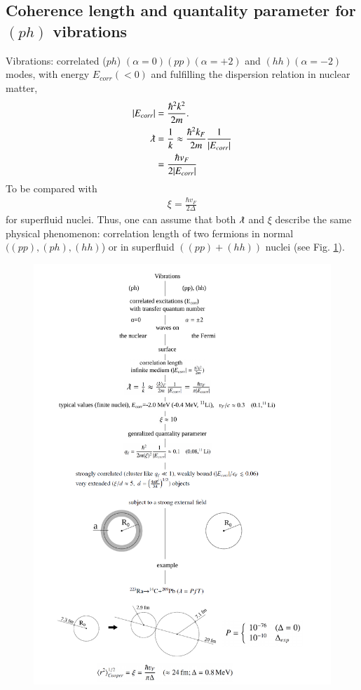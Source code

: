 \begin{subappendices}
 \subsection{Coherence length and quantality parameter for $(ph)$ vibrations}
 Vibrations: correlated ($ph$) $(\alpha=0) (pp) (\alpha=+2)$ and $(hh)(\alpha=-2)$ modes, with energy $E_{corr}(<0)$ and fulfilling the dispersion relation in nuclear matter,
 \begin{align}
 \nonumber|E_{corr}|&=\frac{\hbar^2k^2}{2m}.\\
 \nonumber\lambdabar&=\frac{1}{k}\approx \frac{\hbar^2k_F}{2m}\frac{1}{|E_{corr}|}\\
 &=\frac{\hbar v_F}{2|E_{corr}|}
 \end{align}  
 To be compared with
 \begin{align}
 \xi=\frac{\hbar v_F}{2\Delta}
 \end{align} 
 for superfluid nuclei. Thus, one can assume that both $\lambdabar$ and $\xi$ describe the same physical phenomenon: correlation length of two fermions in normal $((pp),(ph),(hh)$) or in superfluid $((pp)+(hh))$ nuclei (see Fig. \ref{fig3B3x}).
       \begin{figure}
       	\centerline{\includegraphics*[width=17cm,angle=0	]{nutshell/figs/fig3B3x}}
       	\caption{}\label{fig3B3x}
       \end{figure}

\end{subappendices}
